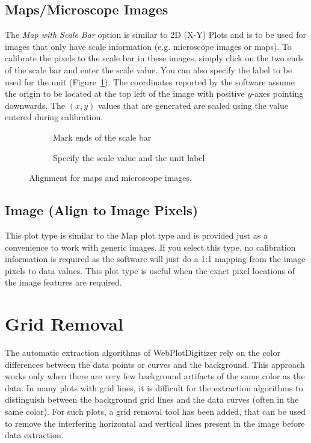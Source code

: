 \documentclass[letterpaper, 11pt]{article}
\begin{document}
\subsection{Maps/Microscope Images}
The \emph{Map with Scale Bar} option is similar to 2D (X-Y) Plots and is to be used for images that only have scale information (e.g. microscope images or maps). To calibrate the pixels to the scale bar in these images, simply click on the two ends of the scale bar and enter the scale value. You can also specify the label to be used for the unit (Figure~\ref{fig:mapAlignment}). The coordinates reported by the software assume the origin to be located at the top left of the image with positive $y$-axes pointing downwards. The $(x,y)$ values that are generated are scaled using the value entered during calibration.

\begin{figure}
\centering
{\begin{subfigure}[b]{0.4\textwidth}
\caption{Mark ends of the scale bar}
\end{subfigure}
\hspace{5mm}
\begin{subfigure}[b]{0.3\textwidth}
\caption{Specify the scale value and the unit label}
\end{subfigure}}
\caption{Alignment for maps and microscope images.}
\label{fig:mapAlignment}
\end{figure}

\subsection{Image (Align to Image Pixels)}
This plot type is similar to the Map plot type and is provided just as a convenience to work with generic images. If you select this type, no calibration information is required as the software will just do a 1:1 mapping from the image pixels to data values. This plot type is useful when the exact pixel locations of the image features are required.

\section{Grid Removal}
The automatic extraction algorithms of WebPlotDigitizer rely on the color differences between the data points or curves and the background. This approach works only when there are very few background artifacts of the same color as the data. In many plots with grid lines, it is difficult for the extraction algorithms to distinguish between the background grid lines and the data curves (often in the same color). For such plots, a grid removal tool has been added, that can be used to remove the interfering horizontal and vertical lines present in the image before data extraction.
\end{document}
